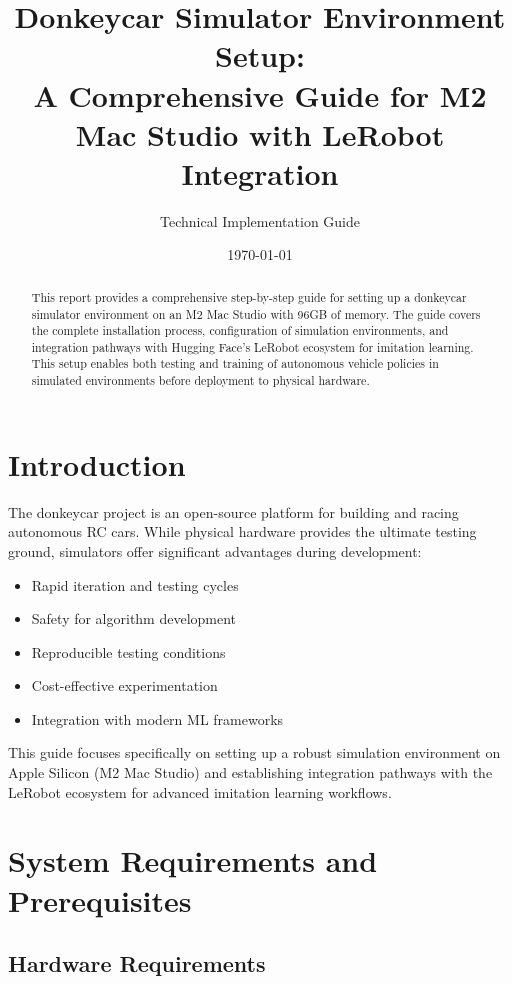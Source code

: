 \documentclass[11pt,a4paper]{article}
\title{Donkeycar Simulator Environment Setup:\\A Comprehensive Guide for M2 Mac Studio with LeRobot Integration}
\author{Technical Implementation Guide}
\date{\today}
\begin{document}
\maketitle

\begin{abstract}
This report provides a comprehensive step-by-step guide for setting up a donkeycar simulator environment on an M2 Mac Studio with 96GB of memory. The guide covers the complete installation process, configuration of simulation environments, and integration pathways with Hugging Face's LeRobot ecosystem for imitation learning. This setup enables both testing and training of autonomous vehicle policies in simulated environments before deployment to physical hardware.
\end{abstract}

\tableofcontents
\newpage

\section{Introduction}

The donkeycar project is an open-source platform for building and racing autonomous RC cars. While physical hardware provides the ultimate testing ground, simulators offer significant advantages during development:

\begin{itemize}
    \item Rapid iteration and testing cycles
    \item Safety for algorithm development
    \item Reproducible testing conditions
    \item Cost-effective experimentation
    \item Integration with modern ML frameworks
\end{itemize}

This guide focuses specifically on setting up a robust simulation environment on Apple Silicon (M2 Mac Studio) and establishing integration pathways with the LeRobot ecosystem for advanced imitation learning workflows.

\section{System Requirements and Prerequisites}

\subsection{Hardware Requirements}
\end{document}
